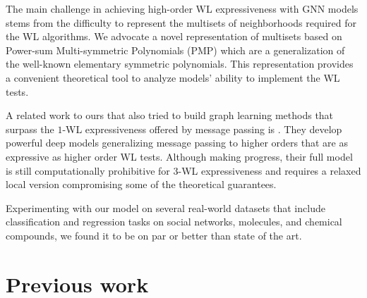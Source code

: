 \documentclass{article}
\begin{document}
The main challenge in achieving high-order WL expressiveness with GNN models stems from the difficulty to represent the multisets of neighborhoods required for the WL algorithms.  We advocate a novel representation of multisets based on Power-sum Multi-symmetric Polynomials (PMP) which are a generalization of the well-known elementary symmetric polynomials. This representation provides a convenient theoretical tool to analyze models' ability to implement the WL tests. 


A related work to ours that also tried to build graph learning methods that surpass the $1$-WL expressiveness offered by message passing is \citet{morris2018weisfeiler}. They develop powerful deep models generalizing message passing to higher orders that are as expressive as higher order WL tests. Although making progress, their full model is still computationally prohibitive for $3$-WL expressiveness and requires a relaxed local version compromising some of the theoretical guarantees. 


Experimenting with our model on several real-world datasets that include classification and regression tasks on social networks, molecules, and chemical compounds, we found it to be on par or better than state of the art. 





\section{Previous work}
\end{document}
